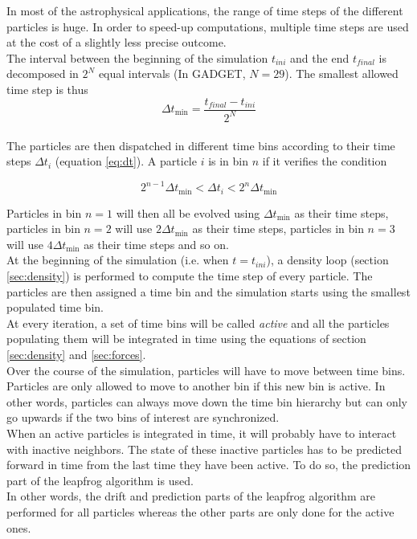 \documentclass[a4paper,10pt]{article}
\begin{document}
In most of the astrophysical applications, the range of time steps of the different particles is huge. In order to
speed-up computations, multiple time steps are used at the cost of a slightly less precise outcome. \\
The interval between the beginning of the simulation $t_{ini}$ and the end $t_{final}$ is decomposed in $2^N$ equal
intervals (In GADGET, $N=29$). The smallest allowed time step is thus
\begin{equation}
 \Delta t_{\min} = \frac{t_{final} - t_{ini}}{2^N}
\end{equation}
\\
The particles are then dispatched in different time bins according to their time steps $\Delta t_i$ (equation
\ref{eq:dt}). A particle $i$ is in bin $n$ if it verifies the condition

\begin{equation}
2^{n-1} \Delta t_{\min}  < \Delta t_i < 2^n\Delta t_{\min} 
\end{equation}

Particles in bin $n=1$ will then all be evolved using $\Delta t_{\min}$ as their time steps, particles in bin $n=2$
will use $2\Delta t_{\min}$ as their time steps, particles in bin $n=3$
will use $4\Delta t_{\min}$ as their time steps and so on. \\

At the beginning of the simulation (i.e. when $t=t_{ini}$), a density loop (section
\ref{sec:density}) is performed to compute the time step of every particle. The particles are then assigned a time bin
and the simulation starts using the smallest populated time bin. \\
At every iteration, a set of time bins will be called \emph{active} and all the particles populating them will be
integrated in time using the equations of section \ref{sec:density} and \ref{sec:forces}.\\
 Over the course of the
simulation, particles will have to move between time bins. Particles are only allowed to move to another bin if this
new bin is active. In other words, particles can always move down the time bin hierarchy but can only go upwards if the
two bins of interest are synchronized.\\

When an active particles is integrated in time, it will probably have to interact with inactive neighbors. The state
of these inactive particles has to be predicted forward in time from the last time they have been active. To do
so, the prediction part of the leapfrog algorithm is used. \\
In other words, the drift and prediction parts of the leapfrog algorithm are performed for all particles whereas the
other parts are only done for the active ones.
\end{document}
